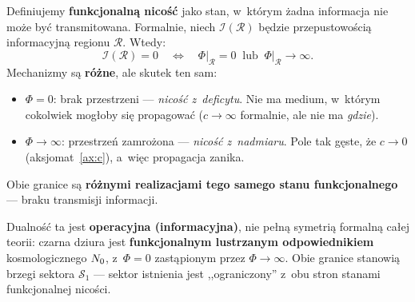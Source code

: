 \begin{definition}\label{def:N0-dual}
Definiujemy \textbf{funkcjonaln\k{a} nico\'s\'c} jako stan,
w~kt\'orym \.zadna informacja nie mo\.ze by\'c transmitowana.
Formalnie, niech $\mathcal{I}(\mathcal{R})$ b\k{e}dzie
przepustowo\'sci\k{a} informacyjn\k{a} regionu $\mathcal{R}$.
Wtedy:
\begin{equation}\label{eq:functional-N0}
    \mathcal{I}(\mathcal{R}) = 0
    \quad\Longleftrightarrow\quad
    \Phi\big|_{\mathcal{R}} = 0
    \;\;\text{lub}\;\;
    \Phi\big|_{\mathcal{R}} \to \infty.
\end{equation}
Mechanizmy s\k{a} \textbf{r\'o\.zne}, ale skutek ten sam:
\begin{itemize}[nosep]
  \item $\Phi = 0$: brak przestrzeni --- \emph{nico\'s\'c z~deficytu}.
    Nie ma medium, w~kt\'orym cokolwiek mog\l{}oby si\k{e}
    propagowa\'c ($c \to \infty$ formalnie, ale nie ma \emph{gdzie}).
  \item $\Phi \to \infty$: przestrze\'n zamro\.zona ---
    \emph{nico\'s\'c z~nadmiaru}.
    Pole tak g\k{e}ste, \.ze $c \to 0$ (aksjomat~\ref{ax:c}),
    a~wi\k{e}c propagacja zanika.
\end{itemize}
Obie granice s\k{a} \textbf{r\'o\.znymi realizacjami tego samego stanu
funkcjonalnego} --- braku transmisji informacji.
\end{definition}

Dualno\'s\'c ta jest \textbf{operacyjna (informacyjna)},
nie pe\l{}n\k{a} symetri\k{a} formaln\k{a} ca\l{}ej teorii:
czarna dziura jest \textbf{funkcjonalnym lustrzanym
odpowiednikiem} kosmologicznego $N_0$, z~$\Phi = 0$
zast\k{a}pionym przez $\Phi \to \infty$.
Obie granice stanowi\k{a} brzegi sektora $\mathcal{S}_1$
--- sektor istnienia jest ,,ograniczony'' z~obu stron
stanami funkcjonalnej nico\'sci.

